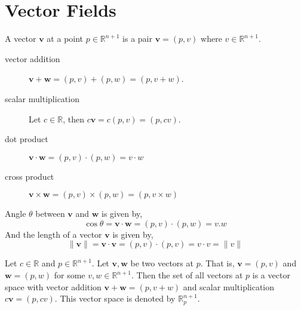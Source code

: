 \section{Vector Fields}
\begin{definition}
	A vector $\mathbf{v}$ at a point $p \in \mathbb{R}^{n+1}$ is a pair $\mathbf{v} = (p,v)$ where $v \in \mathbb{R}^{n+1}$.
\end{definition}
\begin{description}
	\item[vector addition] $\mathbf{v} + \mathbf{w} = (p,v) + (p,w) = (p,v+w)$.
	\item[scalar multiplication] Let $c \in \mathbb{R}$, then $c \mathbf{v} =  c(p,v) = (p,cv)$.
	\item[dot product] $\mathbf{v}\cdot \mathbf{w} = (p,v)\cdot(p,w) = v \cdot w$
	\item[cross product] $\mathbf{v}\times \mathbf{w} = (p,v)\times(p,w) = (p,v \times w)$
\end{description}
\begin{remark}
	Angle $\theta$ between $\mathbf{v}$ and $\mathbf{w}$ is given by,
	\begin{equation}
		\cos \theta = \mathbf{v}\cdot\mathbf{w} = (p,v)\cdot(p,w) = v.w
	\end{equation}
	And the length of a vector $\mathbf{v}$ is given by,
	\begin{equation}
		\|\mathbf{v}\| = \mathbf{v}\cdot\mathbf{v} = (p,v)\cdot(p,v) = v\cdot v = \| v \|
	\end{equation}
\end{remark}

\begin{remark}
	Let $c \in \mathbb{R}$ and $p \in \mathbb{R}^{n+1}$. Let $\mathbf{v}, \mathbf{w}$ be two vectors at $p$. That is, $\mathbf{v} = (p,v)$ and $\mathbf{w} = (p,w)$ for some $v,w \in \mathbb{R}^{n+1}$. Then the set of all vectors at $p$ is a vector space with vector addition $\mathbf{v}+\mathbf{w} = (p,v+w)$ and scalar multiplication $c\mathbf{v} = (p,cv)$. This vector space is denoted by $\mathbb{R}_p^{n+1}$.
\end{remark}

